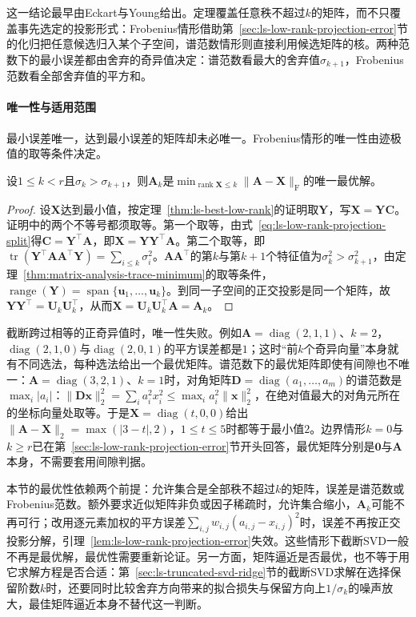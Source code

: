这一结论最早由Eckart与Young给出。定理覆盖任意秩不超过$k$的矩阵，而不只覆盖事先选定的投影形式：Frobenius情形借助第~\ref{sec:ls-low-rank-projection-error}节的化归把任意候选归入某个子空间，谱范数情形则直接利用候选矩阵的核。两种范数下的最小误差都由舍弃的奇异值决定：谱范数看最大的舍弃值$\sigma_{k+1}$，Frobenius范数看全部舍弃值的平方和。

\paragraph{唯一性与适用范围}

最小误差唯一，达到最小误差的矩阵却未必唯一。Frobenius情形的唯一性由迹极值的取等条件决定。

\begin{theorem}[Frobenius最佳逼近的唯一性]
\label{thm:ls-best-low-rank-uniqueness}
设$1\leq k<r$且$\sigma_k>\sigma_{k+1}$，则$\bm A_k$是$\min_{\operatorname{rank}\bm X\leq k}\lVert\bm A-\bm X\rVert_{\mathrm F}$的唯一最优解。
\end{theorem}
\begin{proof}
设$\bm X$达到最小值，按定理~\ref{thm:ls-best-low-rank}的证明取$\bm Y$，写$\bm X=\bm Y\bm C$。证明中的两个不等号都须取等。第一个取等，由式~\eqref{eq:ls-low-rank-projection-split}得$\bm C=\bm Y^\top\bm A$，即$\bm X=\bm Y\bm Y^\top\bm A$。第二个取等，即$\operatorname{tr}(\bm Y^\top\bm A\bm A^\top\bm Y)=\sum_{i\leq k}\sigma_i^2$。$\bm A\bm A^\top$的第$k$与第$k+1$个特征值为$\sigma_k^2>\sigma_{k+1}^2$，由定理~\ref{thm:matrix-analysis-trace-minimum}的取等条件，$\operatorname{range}(\bm Y)=\operatorname{span}\{\bm u_1,\ldots,\bm u_k\}$。到同一子空间的正交投影是同一个矩阵，故$\bm Y\bm Y^\top=\bm U_k\bm U_k^\top$，从而$\bm X=\bm U_k\bm U_k^\top\bm A=\bm A_k$。
\end{proof}

截断跨过相等的正奇异值时，唯一性失败。例如$\bm A=\operatorname{diag}(2,1,1)$、$k=2$，$\operatorname{diag}(2,1,0)$与$\operatorname{diag}(2,0,1)$的平方误差都是$1$；这时“前$k$个奇异向量”本身就有不同选法，每种选法给出一个最优矩阵。谱范数下的最优矩阵即使有间隙也不唯一：$\bm A=\operatorname{diag}(3,2,1)$、$k=1$时，对角矩阵$\bm D=\operatorname{diag}(a_1,\ldots,a_m)$的谱范数是$\max_i\lvert a_i\rvert$：$\lVert\bm D\bm x\rVert_2^2=\sum_ia_i^2x_i^2\leq\max_ia_i^2\lVert\bm x\rVert_2^2$，在绝对值最大的对角元所在的坐标向量处取等。于是$\bm X=\operatorname{diag}(t,0,0)$给出$\lVert\bm A-\bm X\rVert_2=\max(\lvert3-t\rvert,2)$，$1\leq t\leq5$时都等于最小值$2$。边界情形$k=0$与$k\geq r$已在第~\ref{sec:ls-low-rank-projection-error}节开头回答，最优矩阵分别是$\bm0$与$\bm A$本身，不需要套用间隙判据。

本节的最优性依赖两个前提：允许集合是全部秩不超过$k$的矩阵，误差是谱范数或Frobenius范数。额外要求近似矩阵非负或因子稀疏时，允许集合缩小，$\bm A_k$可能不再可行；改用逐元素加权的平方误差$\sum_{i,j}w_{i,j}(a_{i,j}-x_{i,j})^2$时，误差不再按正交投影分解，引理~\ref{lem:ls-low-rank-projection-error}失效。这些情形下截断SVD一般不再是最优解，最优性需要重新论证。另一方面，矩阵逼近是否最优，也不等于用它求解方程是否合适：第~\ref{sec:ls-truncated-svd-ridge}节的截断SVD求解在选择保留阶数$k$时，还要同时比较舍弃方向带来的拟合损失与保留方向上$1/\sigma_k$的噪声放大，最佳矩阵逼近本身不替代这一判断。

